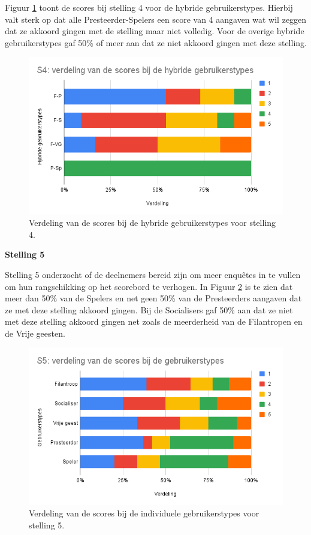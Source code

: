 Figuur \ref{fig:s4_hybride} toont de scores bij stelling 4 voor de hybride gebruikerstypes. Hierbij valt sterk op dat alle Presteerder-Spelers een score van 4 aangaven wat wil zeggen dat ze akkoord gingen met de stelling maar niet volledig. Voor de overige hybride gebruikerstypes gaf 50\% of meer aan dat ze niet akkoord gingen met deze stelling.

\begin{figure}
    \includegraphics[width=\linewidth]{S4_Hybride.png}
    \caption{Verdeling van de scores bij de hybride gebruikerstypes voor stelling 4.}
    \label{fig:s4_hybride}
\end{figure}

\textbf{Stelling 5}

Stelling 5 onderzocht of de deelnemers bereid zijn om meer enquêtes in te vullen om hun rangschikking op het scorebord te verhogen. In Figuur \ref{fig:s5} is te zien dat meer dan 50\% van de Spelers en net geen 50\% van de Presteerders aangaven dat ze met deze stelling akkoord gingen. Bij de Socialisers gaf 50\% aan dat ze niet met deze stelling akkoord gingen net zoals de meerderheid van de Filantropen en de Vrije geesten.

\begin{figure}
    \includegraphics[width=\linewidth]{S5.png}
    \caption{Verdeling van de scores bij de individuele gebruikerstypes voor stelling 5.}
    \label{fig:s5}
\end{figure}


